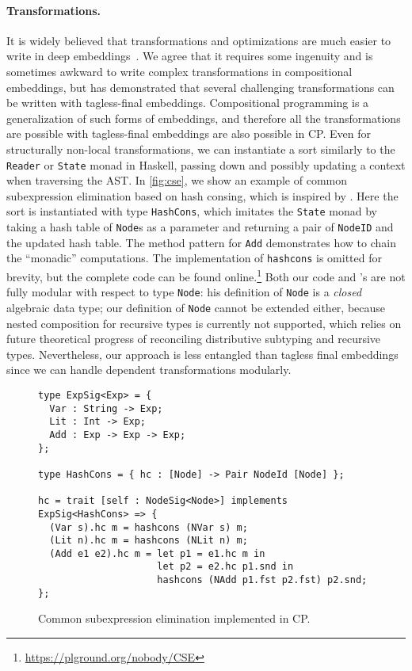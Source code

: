 \paragraph{Transformations.}
It is widely believed that transformations and optimizations are much easier to
write in deep embeddings~\citep{jovanovic2014yinyang,scherr2014implicit}. We
agree that it requires some ingenuity and is sometimes awkward to write complex
transformations in compositional embeddings, but \citet{kiselyov2010typed} has
demonstrated that several challenging transformations can be written with
tagless-final embeddings. Compositional programming is a generalization of such
forms of embeddings, and therefore all the transformations are possible with
tagless-final embeddings are also possible in CP. Even for structurally
non-local transformations, we can instantiate a sort similarly to the
\lstinline{Reader} or \lstinline{State} monad in Haskell, passing down and
possibly updating a context when traversing the AST. In \autoref{fig:cse}, we
show an example of common subexpression elimination based on hash consing, which
is inspired by \citet{kiselyov2011implementing}. Here the sort is instantiated
with type \lstinline{HashCons}, which imitates the \lstinline{State} monad by
taking a hash table of \lstinline{Node}s as a parameter and returning a pair of
\lstinline{NodeID} and the updated hash table. The method pattern for
\lstinline{Add} demonstrates how to chain the ``monadic'' computations. The
implementation of \lstinline{hashcons} is omitted for brevity, but the complete
code can be found online.\footnote{\url{https://plground.org/nobody/CSE}} Both
our code and \citeauthor{kiselyov2011implementing}'s are not fully modular with
respect to type \lstinline{Node}: his definition of \lstinline{Node} is a
\emph{closed} algebraic data type; our definition of \lstinline{Node} cannot be
extended either, because nested composition for recursive types is currently not
supported, which relies on future theoretical progress of reconciling
distributive subtyping and recursive types. Nevertheless, our approach is less
entangled than tagless final embeddings since we can handle dependent
transformations modularly.

\begin{figure}
\begin{lstlisting}
type ExpSig<Exp> = {
  Var : String -> Exp;
  Lit : Int -> Exp;
  Add : Exp -> Exp -> Exp;
};

type HashCons = { hc : [Node] -> Pair NodeId [Node] };

hc = trait [self : NodeSig<Node>] implements ExpSig<HashCons> => {
  (Var s).hc m = hashcons (NVar s) m;
  (Lit n).hc m = hashcons (NLit n) m;
  (Add e1 e2).hc m = let p1 = e1.hc m in
                     let p2 = e2.hc p1.snd in
                     hashcons (NAdd p1.fst p2.fst) p2.snd;
};
\end{lstlisting}
\caption{Common subexpression elimination implemented in CP.} \label{fig:cse}
\end{figure}


